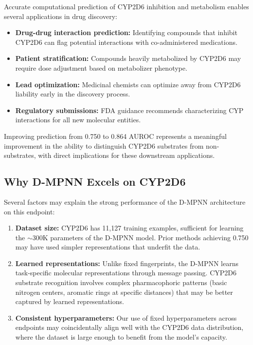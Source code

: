 \documentclass[11pt]{article}
\begin{document}
Accurate computational prediction of CYP2D6 inhibition and metabolism enables several applications in drug discovery:

\begin{itemize}
    \item \textbf{Drug-drug interaction prediction:} Identifying compounds that inhibit CYP2D6 can flag potential interactions with co-administered medications.
    \item \textbf{Patient stratification:} Compounds heavily metabolized by CYP2D6 may require dose adjustment based on metabolizer phenotype.
    \item \textbf{Lead optimization:} Medicinal chemists can optimize away from CYP2D6 liability early in the discovery process.
    \item \textbf{Regulatory submissions:} FDA guidance recommends characterizing CYP interactions for all new molecular entities.
\end{itemize}

Improving prediction from 0.750 to 0.864 AUROC represents a meaningful improvement in the ability to distinguish CYP2D6 substrates from non-substrates, with direct implications for these downstream applications.

\subsection{Why D-MPNN Excels on CYP2D6}

Several factors may explain the strong performance of the D-MPNN architecture on this endpoint:

\begin{enumerate}
    \item \textbf{Dataset size:} CYP2D6 has 11,127 training examples, sufficient for learning the $\sim$300K parameters of the D-MPNN model. Prior methods achieving 0.750 may have used simpler representations that underfit the data.
    \item \textbf{Learned representations:} Unlike fixed fingerprints, the D-MPNN learns task-specific molecular representations through message passing. CYP2D6 substrate recognition involves complex pharmacophoric patterns (basic nitrogen centers, aromatic rings at specific distances) that may be better captured by learned representations.
    \item \textbf{Consistent hyperparameters:} Our use of fixed hyperparameters across endpoints may coincidentally align well with the CYP2D6 data distribution, where the dataset is large enough to benefit from the model's capacity.
\end{enumerate}
\end{document}
